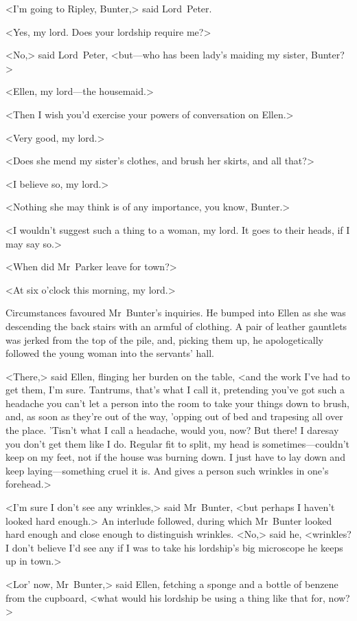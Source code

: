 <I'm going to Ripley, Bunter,> said Lord~Peter.

<Yes, my lord. Does your lordship require me?>

<No,> said Lord~Peter, <but—who has been lady's maiding my sister, Bunter?>

<Ellen, my lord—the housemaid.>

<Then I wish you'd exercise your powers of conversation on Ellen.>

<Very good, my lord.>

<Does she mend my sister's clothes, and brush her skirts, and all that?>

<I believe so, my lord.>

<Nothing she may think is of any importance, you know, Bunter.>

<I wouldn't suggest such a thing to a woman, my lord. It goes to their heads, if I may say so.>

<When did Mr~Parker leave for town?>

<At six o'clock this morning, my lord.>

\divider

Circumstances favoured Mr~Bunter's inquiries. He bumped into Ellen as she was descending the back stairs with an armful of clothing. A pair of leather gauntlets was jerked from the top of the pile, and, picking them up, he apologetically followed the young woman into the servants' hall.

<There,> said Ellen, flinging her burden on the table, <and the work I've had to get them, I'm sure. Tantrums, that's what I call it, pretending you've got such a headache you can't let a person into the room to take your things down to brush, and, as soon as they're out of the way, 'opping out of bed and trapesing all over the place.  'Tisn't what I call a headache, would you, now? But there! I daresay you don't get them like I do. Regular fit to split, my head is sometimes—couldn't keep on my feet, not if the house was burning down.  I just have to lay down and keep laying—something cruel it is. And gives a person such wrinkles in one's forehead.>

<I'm sure I don't see any wrinkles,> said Mr~Bunter, <but perhaps I haven't looked hard enough.> An interlude followed, during which Mr~Bunter looked hard enough and close enough to distinguish wrinkles.  <No,> said he, <wrinkles? I don't believe I'd see any if I was to take his lordship's big microscope he keeps up in town.>

<Lor' now, Mr~Bunter,> said Ellen, fetching a sponge and a bottle of benzene from the cupboard, <what would his lordship be using a thing like that for, now?>

